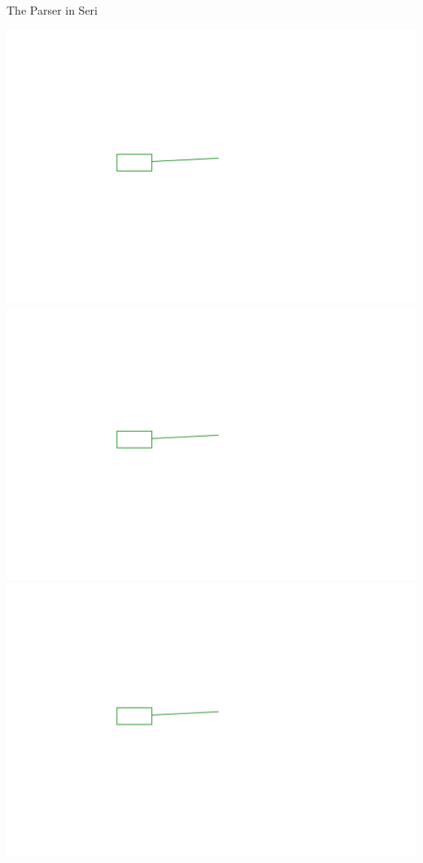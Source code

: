 \documentclass{beamer}
\begin{document}
\begin{frame}{The Parser in Seri}
\begin{overprint}
 \includegraphics[width=\textwidth]{parser4}
 \includegraphics[width=\textwidth]{parser5}
 \includegraphics[width=\textwidth]{parser6}

\end{overprint}
\end{frame}
\end{document}

